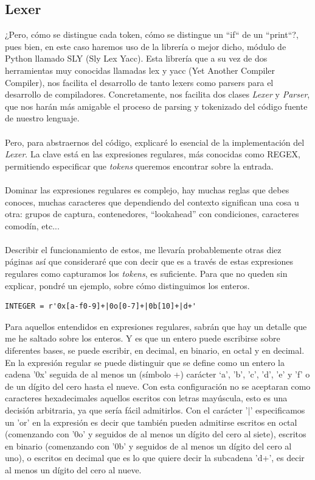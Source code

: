 \subsection{Lexer}
\noindent ¿Pero, cómo se distingue cada token, cómo se distingue un ``if`` de un  ``print``?, pues bien, en este caso haremos uso de la librería o mejor dicho, módulo de Python llamado SLY (Sly Lex Yacc). Esta librería que a su vez de dos herramientas muy conocidas llamadas lex y yacc (Yet Another Compiler Compiler), nos facilita el desarrollo de tanto lexers como parsers para el desarrollo de compiladores. Concretamente, nos facilita dos clases  \textit{Lexer} y \textit{Parser}, que nos harán más amigable el proceso de parsing y tokenizado del código fuente de nuestro lenguaje.  \\\\
Pero, para abstraernos del código, explicaré lo esencial de la implementación del \textit{Lexer}. La clave está en las expresiones regulares, más conocidas como REGEX, permitiendo especificar que \textit{tokens} queremos encontrar sobre la entrada.
\\\\
Dominar las expresiones regulares es complejo, hay muchas reglas que debes conoces, muchas caracteres que dependiendo del contexto significan una cosa u otra: grupos de captura, contenedores, ``lookahead'' con condiciones, caracteres comodín, etc... \\\\
Describir el funcionamiento de estos, me llevaría probablemente otras diez páginas así que consideraré que con decir que es a través de estas expresiones regulares como capturamos los \textit{tokens}, es suficiente. Para que no queden sin explicar, pondré un ejemplo, sobre cómo distinguimos los enteros.
\begin{lstlisting}[style=pythonStyle]
INTEGER = r'0x[a-f0-9]+|0o[0-7]+|0b[10]+|d+'
\end{lstlisting}
\noindent Para aquellos entendidos en expresiones regulares, sabrán que hay un detalle que me he saltado sobre los enteros. Y es que un entero puede escribirse sobre diferentes bases, se puede escribir, en decimal, en binario, en octal y en decimal.
En la expresión regular se puede distinguir que se define como un entero la cadena '0x' seguida de al menos un (símbolo +) carácter `a', 'b', 'c', 'd', 'e' y 'f' o de un dígito del cero hasta el nueve. Con esta configuración no se aceptaran como caracteres hexadecimales aquellos escritos con letras mayúscula, esto es una decisión arbitraria, ya que sería fácil admitirlos. Con el carácter '$|$' especificamos un 'or' en la expresión es decir que también pueden admitirse escritos en octal (comenzando con '0o' y seguidos de al menos un dígito del cero al siete), escritos en binario (comenzando con '0b' y seguidos de al menos un dígito del cero al uno), o escritos en decimal que es lo que quiere decir la subcadena 'd+', es decir al menos un dígito del cero al nueve. \\\\
